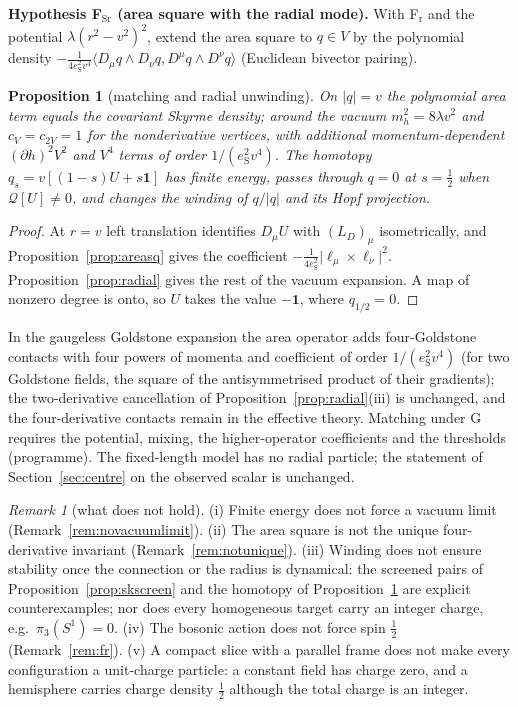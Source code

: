 \documentclass[aps,pra,onecolumn,superscriptaddress,nofootinbib,10pt]{revtex4-2}
\newtheorem{proposition}[theorem]{Proposition}
\theoremstyle{definition}
\theoremstyle{remark}
\newtheorem{remark}[theorem]{Remark}
\newcommand{\ip}[2]{\langle #1,#2\rangle}
\begin{document}
\smallskip\noindent\textbf{Hypothesis F$_{\mathrm{Sr}}$ (area square with the radial mode).}\label{hyp:FSr}  With F$_{\mathrm r}$ and the potential $\lambda(r^2-v^2)^2$, extend
the area square to $q\in V$ by the polynomial density $-\frac1{4e_{\mathrm S}^2v^4}\ip{D_\mu q\wedge D_\nu q}{D^\mu q\wedge D^\nu q}$ (Euclidean bivector pairing).

\begin{proposition}[matching and radial unwinding]\label{prop:skradial}
On $\lvert q\rvert=v$ the polynomial area term equals the covariant Skyrme density; around the vacuum $m_h^2=8\lambda v^2$ and
$c_V=c_{2V}=1$ for the nonderivative vertices, with additional momentum-dependent $(\partial h)^2V^2$ and $V^4$ terms of order
$1/(e_{\mathrm S}^2v^4)$.  The homotopy $q_s=v[(1-s)U+s\mathbf1]$ has finite energy, passes through $q=0$ at $s=\tfrac12$ when $\mathcal Q[U]\ne0$, and
changes the winding of $q/\lvert q\rvert$ and its Hopf projection.
\end{proposition}
\begin{proof}
At $r=v$ left translation identifies $D_\mu U$ with $(L_D)_\mu$ isometrically, and Proposition~\ref{prop:areasq} gives the
coefficient $-\frac1{4e_{\mathrm S}^2}\lvert\ell_\mu\times\ell_\nu\rvert^2$.  Proposition~\ref{prop:radial} gives the rest of the vacuum expansion.  A map of
nonzero degree is onto, so $U$ takes the value $-\mathbf1$, where $q_{1/2}=0$.
\end{proof}
\noindent In the gaugeless Goldstone expansion the area operator adds four-Goldstone contacts with four powers
of momenta and coefficient of order $1/(e_{\mathrm S}^2v^4)$ (for two Goldstone fields, the square of the antisymmetrised
product of their gradients); the two-derivative cancellation of Proposition~\ref{prop:radial}(iii) is unchanged,
and the four-derivative contacts remain in the effective theory.  Matching under G requires the
potential, mixing, the higher-operator coefficients and the thresholds (programme).  The fixed-length
model has no radial particle; the statement of Section~\ref{sec:centre} on the observed scalar is unchanged.

\begin{remark}[what does not hold]\label{rem:sknogo}
(i) Finite energy does not force a vacuum limit (Remark~\ref{rem:novacuumlimit}).  (ii) The area square is not the
unique four-derivative invariant (Remark~\ref{rem:notunique}).  (iii) Winding does not ensure stability once the
connection or the radius is dynamical: the screened pairs of Proposition~\ref{prop:skscreen} and the homotopy of
Proposition~\ref{prop:skradial} are explicit counterexamples; nor does every homogeneous target carry an integer
charge, e.g.\ $\pi_3(S^1)=0$.  (iv) The bosonic action does not force spin $\tfrac12$ (Remark~\ref{rem:fr}).  (v) A compact
slice with a parallel frame does not make every configuration a unit-charge particle: a constant field has
charge zero, and a hemisphere carries charge density $\tfrac12$ although the total charge is an integer.
\end{remark}
\end{document}
